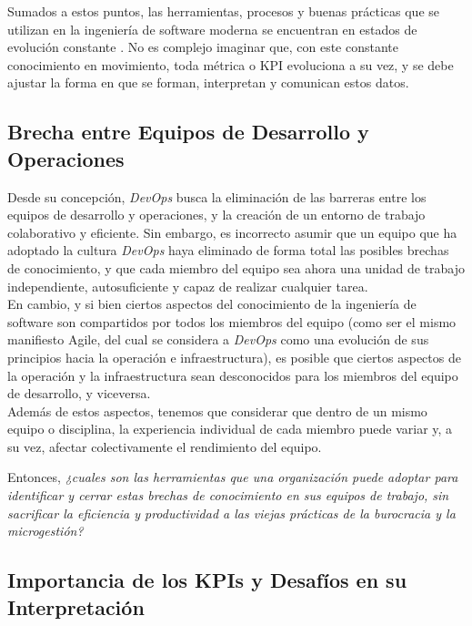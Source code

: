 \documentclass[journal]{IEEEtran}
\begin{document}
Sumados a estos puntos, las herramientas, procesos y buenas prácticas que se utilizan en la ingeniería de software moderna se encuentran en estados de evolución constante \cite{ayoup2022achievement}. No es complejo imaginar que, con este constante conocimiento en movimiento, toda métrica o KPI evoluciona a su vez, y se debe ajustar la forma en que se forman, interpretan y comunican estos datos.

\subsection{\textbf{Brecha entre Equipos de Desarrollo y Operaciones}}

Desde su concepción, \textit{DevOps} busca la eliminación de las barreras entre los equipos de desarrollo y operaciones, y la creación de un entorno de trabajo colaborativo y eficiente. 
Sin embargo, es incorrecto asumir que un equipo que ha adoptado la cultura \textit{DevOps} haya eliminado de forma total las posibles brechas de conocimiento, y que cada miembro del equipo sea ahora una unidad de trabajo independiente, autosuficiente y capaz de realizar cualquier tarea. 
\\En cambio, y si bien ciertos aspectos del conocimiento de la ingeniería de software son compartidos por todos los miembros del equipo (como ser el mismo manifiesto Agile\cite{amaro2024devops}, del cual se considera a \textit{DevOps} como una evolución de sus principios hacia la operación e infraestructura\cite[Part I. The Three Ways]{kim2021devops}), es posible que ciertos aspectos de la operación y la infraestructura sean desconocidos para los miembros del equipo de desarrollo, y viceversa.
\\Además de estos aspectos, tenemos que considerar que dentro de un mismo equipo o disciplina, la experiencia individual de cada miembro puede variar y, a su vez, afectar colectivamente el rendimiento del equipo.

Entonces, \textit{¿cuales son las herramientas que una organización puede adoptar para identificar y cerrar estas brechas de conocimiento en sus equipos de trabajo, sin sacrificar la eficiencia y productividad a las viejas prácticas de la burocracia y la microgestión?}

\subsection{\textbf{Importancia de los KPIs y Desafíos en su Interpretación}}
\end{document}
